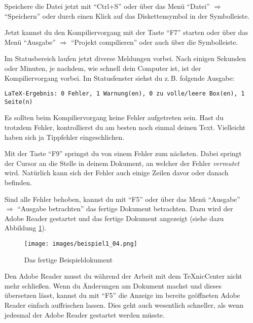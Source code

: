 Speichere die Datei jetzt mit \enquote{Ctrl+S} oder über das Menü \enquote{Datei} $\Rightarrow$ \enquote{Speichern} oder durch einen Klick auf das Diskettensymbol in der Symbolleiste.

Jetzt kannst du den Kompiliervorgang mit der Taste \enquote{F7} starten oder über das Menü \enquote{Ausgabe} $\Rightarrow$ \enquote{Projekt compilieren} oder auch über die Symbolleiste.

Im Statusbereich laufen jetzt diverse Meldungen vorbei. Nach einigen Sekunden oder Minuten, je nachdem, wie schnell dein Computer ist, ist der Kompiliervorgang vorbei. Im Statusfenster siehst du z.\,B. folgende Ausgabe:
\begin{lstlisting}
LaTeX-Ergebnis: 0 Fehler, 1 Warnung(en), 0 zu volle/leere Box(en), 1 Seite(n)
\end{lstlisting}

Es sollten beim Kompiliervorgang keine Fehler aufgetreten sein. Hast du trotzdem Fehler, kontrollierst du am besten noch einmal deinen Text. Vielleicht haben sich ja Tippfehler eingeschlichen.

Mit der Taste \enquote{F9} springst du von einem Fehler zum nächsten. Dabei springt der Cursor an die Stelle in deinem Dokument, an welcher der Fehler \emph{vermutet} wird. Natürlich kann sich der Fehler auch einige Zeilen davor oder danach befinden.

Sind alle Fehler behoben, kannst du mit \enquote{F5} oder über das Menü \enquote{Ausgabe} $\Rightarrow$ \enquote{Ausgabe betrachten} das fertige Dokument betrachten. Dazu wird der Adobe Reader gestartet und das fertige Dokument angezeigt (siehe dazu Abbildung \ref{fig:beispiel1_04}).

\begin{figure}[ht]
	\begin{center}
		\texttt{[image: images/beispiel1\_04.png]}
	\end{center}
	\caption{Das fertige Beispieldokument}
	\label{fig:beispiel1_04}
\end{figure}

Den Adobe Reader musst du während der Arbeit mit dem TeXnicCenter nicht mehr schließen. Wenn du Änderungen am Dokument machst und dieses übersetzen lässt, kannst du mit \enquote{F5} die Anzeige im bereits geöffneten Adobe Reader einfach auffrischen lassen. Dies geht auch wesentlich schneller, als wenn jedesmal der Adobe Reader gestartet werden müsste.

